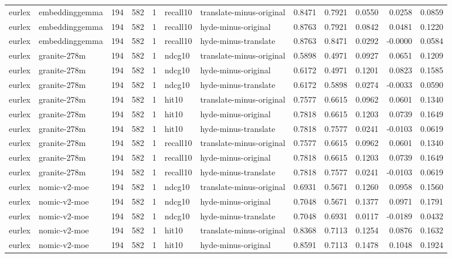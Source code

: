 \begin{tabular}{llrrrllrrrrr}
eurlex & embeddinggemma & 194 & 582 & 1 & recall10 & translate-minus-original & 0.8471 & 0.7921 & 0.0550 & 0.0258 & 0.0859 \\
eurlex & embeddinggemma & 194 & 582 & 1 & recall10 & hyde-minus-original & 0.8763 & 0.7921 & 0.0842 & 0.0481 & 0.1220 \\
eurlex & embeddinggemma & 194 & 582 & 1 & recall10 & hyde-minus-translate & 0.8763 & 0.8471 & 0.0292 & -0.0000 & 0.0584 \\
eurlex & granite-278m & 194 & 582 & 1 & ndcg10 & translate-minus-original & 0.5898 & 0.4971 & 0.0927 & 0.0651 & 0.1209 \\
eurlex & granite-278m & 194 & 582 & 1 & ndcg10 & hyde-minus-original & 0.6172 & 0.4971 & 0.1201 & 0.0823 & 0.1585 \\
eurlex & granite-278m & 194 & 582 & 1 & ndcg10 & hyde-minus-translate & 0.6172 & 0.5898 & 0.0274 & -0.0033 & 0.0590 \\
eurlex & granite-278m & 194 & 582 & 1 & hit10 & translate-minus-original & 0.7577 & 0.6615 & 0.0962 & 0.0601 & 0.1340 \\
eurlex & granite-278m & 194 & 582 & 1 & hit10 & hyde-minus-original & 0.7818 & 0.6615 & 0.1203 & 0.0739 & 0.1649 \\
eurlex & granite-278m & 194 & 582 & 1 & hit10 & hyde-minus-translate & 0.7818 & 0.7577 & 0.0241 & -0.0103 & 0.0619 \\
eurlex & granite-278m & 194 & 582 & 1 & recall10 & translate-minus-original & 0.7577 & 0.6615 & 0.0962 & 0.0601 & 0.1340 \\
eurlex & granite-278m & 194 & 582 & 1 & recall10 & hyde-minus-original & 0.7818 & 0.6615 & 0.1203 & 0.0739 & 0.1649 \\
eurlex & granite-278m & 194 & 582 & 1 & recall10 & hyde-minus-translate & 0.7818 & 0.7577 & 0.0241 & -0.0103 & 0.0619 \\
eurlex & nomic-v2-moe & 194 & 582 & 1 & ndcg10 & translate-minus-original & 0.6931 & 0.5671 & 0.1260 & 0.0958 & 0.1560 \\
eurlex & nomic-v2-moe & 194 & 582 & 1 & ndcg10 & hyde-minus-original & 0.7048 & 0.5671 & 0.1377 & 0.0971 & 0.1791 \\
eurlex & nomic-v2-moe & 194 & 582 & 1 & ndcg10 & hyde-minus-translate & 0.7048 & 0.6931 & 0.0117 & -0.0189 & 0.0432 \\
eurlex & nomic-v2-moe & 194 & 582 & 1 & hit10 & translate-minus-original & 0.8368 & 0.7113 & 0.1254 & 0.0876 & 0.1632 \\
eurlex & nomic-v2-moe & 194 & 582 & 1 & hit10 & hyde-minus-original & 0.8591 & 0.7113 & 0.1478 & 0.1048 & 0.1924 \\

\end{tabular}
